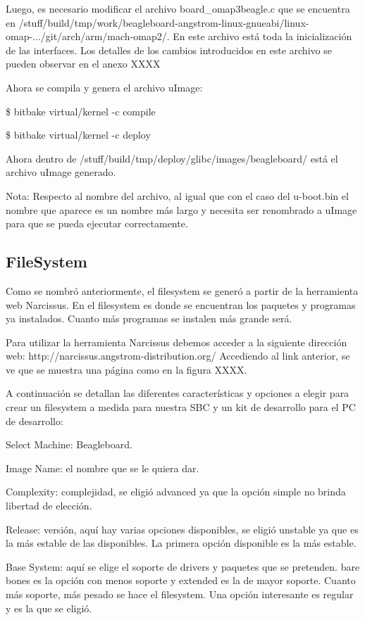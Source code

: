 Luego, es necesario modificar el archivo board\_omap3beagle.c que se encuentra en /stuff/build/tmp/work/beagleboard-angstrom-linux-gnueabi/linux-omap-.../git/arch/arm/mach-omap2/. En este archivo está toda la inicialización de las interfaces. Los detalles de los cambios introducidos en este archivo se pueden observar en el anexo XXXX

\bigskip
Ahora se compila y genera el archivo uImage:

\centerline{\$ bitbake virtual/kernel -c compile}

\centerline{\$ bitbake virtual/kernel -c deploy}

\bigskip
Ahora dentro de /stuff/build/tmp/deploy/glibc/images/beagleboard/ está el archivo uImage generado.

\bigskip
Nota: Respecto al nombre del archivo, al igual que con el caso del u-boot.bin el nombre que aparece es un nombre más largo y necesita ser renombrado a uImage para que se pueda ejecutar correctamente.


\subsection{FileSystem}

Como se nombró anteriormente, el filesystem se generó a partir de la herramienta web Narcissus.
En el filesystem es donde se encuentran los paquetes y programas ya instalados. Cuanto más programas se instalen más grande será.

\bigskip
Para utilizar la herramienta Narcissus debemos acceder a la siguiente dirección web: http://narcissus.angstrom-distribution.org/ 
Accediendo al link anterior, se ve que se muestra una página como en la figura XXXX.

\bigskip
A continuación se detallan las diferentes características y opciones a elegir para crear un filesystem a medida para nuestra SBC y un kit de desarrollo para el PC de desarrollo:

\bigskip
Select Machine: Beagleboard.

Image Name: el nombre que se le quiera dar.

Complexity: complejidad, se eligió advanced ya que la opción simple no brinda libertad de elección.

Release: versión, aquí hay varias opciones disponibles, se eligió unstable ya que es la más estable de las disponibles. La primera opción disponible es la más estable.

Base System: aquí se elige el soporte de drivers y paquetes que se pretenden. bare bones es la opción con menos soporte y extended es la de mayor soporte. Cuanto más soporte, más pesado se hace el filesystem. Una opción interesante es regular y es la que se eligió.

